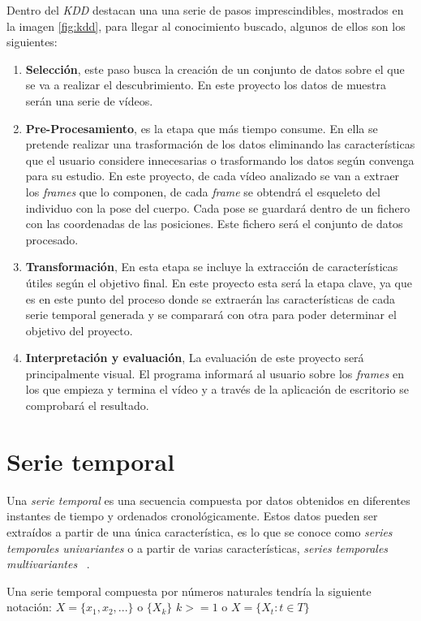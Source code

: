 Dentro del \emph{KDD} destacan una una serie de pasos imprescindibles, mostrados en la imagen \ref{fig:kdd}, para llegar al conocimiento buscado, algunos de ellos son los siguientes:
\begin{enumerate}
    \item \textbf{Selección}, este paso busca la creación de un conjunto de datos sobre el que se va a realizar el descubrimiento. En este proyecto los datos de muestra serán una serie de vídeos. 
    \item \textbf{Pre-Procesamiento}, es la etapa que más tiempo consume. En ella se pretende realizar una trasformación de los datos eliminando las características que el usuario considere innecesarias o trasformando los datos según convenga para su estudio. En este proyecto, de cada vídeo analizado se van a extraer los \textit{frames} que lo componen, de cada \textit{frame} se obtendrá el esqueleto del individuo con la pose del cuerpo. Cada pose se guardará dentro de un fichero con las coordenadas de las posiciones. Este fichero será el conjunto de datos procesado.
    \item \textbf{Transformación}, En esta etapa se incluye la extracción de características útiles según el objetivo final. En este proyecto esta será la etapa clave, ya que es en este punto del proceso donde se extraerán las características de cada serie temporal generada y se comparará con otra para poder determinar el objetivo del proyecto. 
    \item \textbf{Interpretación y evaluación}, La evaluación de este proyecto será principalmente visual. El programa informará al usuario sobre los \textit{frames} en los que empieza y termina el vídeo y a través de la aplicación de escritorio se comprobará el resultado. 
\end{enumerate}


\section{Serie temporal}
Una \emph{serie temporal} es una secuencia compuesta por datos obtenidos en diferentes instantes de tiempo y ordenados cronológicamente. Estos datos pueden ser extraídos a partir de una única característica, es lo que se conoce como \emph{series temporales univariantes} o a partir de varias características, \emph{series temporales multivariantes} ~\cite{mauricio2007analisis}.

Una serie temporal compuesta por números naturales tendría la siguiente notación: $X = \{x_1 , x_2, ...\}$ o $\{X_k\}$  $k>=1 $ o $ X = \{X_t : t \in T\}$

